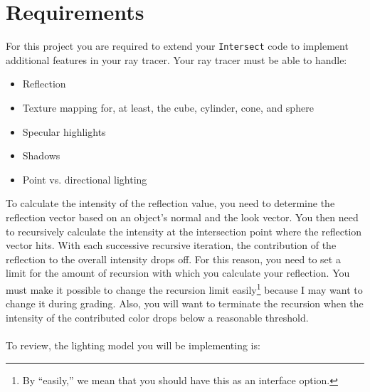 \documentclass[10pt,twocolumn]{article}
\begin{document}
\section{Requirements}
For this project you are required to extend your {\tt Intersect} code to implement additional features in your ray tracer. Your ray tracer must be able to handle:
\begin{itemize}
\item Reflection
\item Texture mapping for, at least, the cube, cylinder, cone, and sphere 
\item Specular highlights
\item Shadows
\item Point vs. directional lighting
\end{itemize}
To calculate the intensity of the reflection value, you need to determine the reflection vector based on an object's normal and the look vector. You then need to recursively calculate the intensity at the intersection point where the reflection vector hits. With each successive recursive iteration, the contribution of the reflection to the overall intensity drops off. For this reason, you need to set a limit for the amount of recursion with which you calculate your reflection. You must make it possible to change the recursion limit easily\footnote{By ``easily,'' we mean that you should have this as an interface option.} because I may want to change it during grading. Also, you will want to terminate the recursion when the intensity of the contributed color drops below a reasonable threshold.\\\\To review, the lighting model you will be implementing is:
\end{document}
